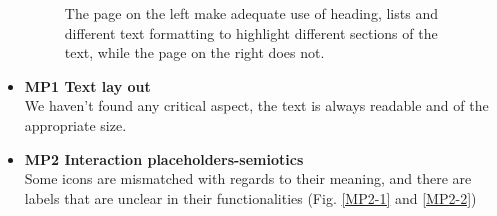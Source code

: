 \begin{itemize}
        \begin{figure}[!ht]
            \centering
            \qquad
            \captionsetup{justification=centering}
            \caption{The page on the left make adequate use of heading, lists and different text formatting to highlight different sections of the text, while the page on the right does not.}%
            \label{fig:MC1-3}%
        \end{figure}
    \item \textbf{MP1 Text lay out}\\
        We haven't found any critical aspect, the text is always readable and of the appropriate size.\\
    \item \textbf{MP2 Interaction placeholders-semiotics}\\
        Some icons are mismatched with regards to their meaning, and there are labels that are unclear in their functionalities (Fig. \ref{MP2-1} and \ref{MP2-2})
        \begin{figure}[!ht]
            \begin{minipage}{\linewidth}
                \centering

\end{minipage}
\end{figure}
\end{itemize}
